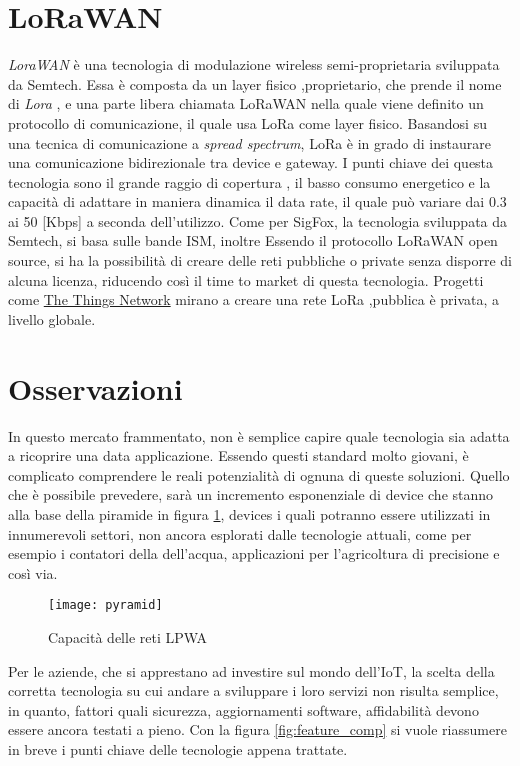 \section{LoRaWAN}
\emph{LoraWAN} è una tecnologia di modulazione wireless semi-proprietaria 
sviluppata da Semtech. Essa è composta da un layer fisico ,proprietario, che
prende il nome di \emph{Lora}\cite{LoRaCss101} , e una parte libera chiamata 
LoRaWAN\cite{LoRaWAN101} nella quale viene definito un protocollo di comunicazione, 
il quale usa LoRa come layer fisico. 
Basandosi su una tecnica di comunicazione a \emph{spread spectrum}, LoRa è in
grado di instaurare una comunicazione bidirezionale tra device e gateway.
I punti chiave dei questa tecnologia sono il grande raggio di copertura , il 
basso consumo energetico e la capacità di adattare in maniera dinamica il
data rate, il quale può variare dai 0.3 ai 50 [Kbps] a seconda dell'utilizzo. 
Come per SigFox, la tecnologia sviluppata da Semtech, si basa sulle bande ISM,
inoltre Essendo il protocollo LoRaWAN open source, si ha la possibilità di
creare delle reti pubbliche o private senza disporre di alcuna licenza, 
riducendo così il time to market di questa tecnologia.  
Progetti come \href{https://www.thethingsnetwork.org/}{The Things Network}
mirano a creare una rete LoRa ,pubblica è privata,  a livello globale.

\section{Osservazioni}
In questo mercato frammentato, non è semplice capire quale tecnologia sia adatta
a ricoprire una data applicazione. Essendo questi standard molto giovani, è
complicato comprendere le reali potenzialità di ognuna di queste soluzioni.
Quello che è possibile prevedere, sarà un incremento esponenziale di device che
stanno alla base della piramide in figura \ref{fig:pyramid}, devices i quali
potranno essere utilizzati in innumerevoli settori, non ancora esplorati dalle
tecnologie attuali, come per esempio i contatori della dell'acqua, applicazioni
per l'agricoltura di precisione e così via. 

\begin{figure}[ht]
    \centering 
                \texttt{[image: pyramid]}
    \caption{Capacità delle reti LPWA}
    \label{fig:pyramid} 
\end{figure}

\pagebreak
Per le aziende, che si apprestano ad investire sul mondo dell'IoT, la scelta
della corretta tecnologia su cui andare a sviluppare i loro servizi non risulta
semplice, in quanto, fattori quali sicurezza, aggiornamenti software,
affidabilità devono essere ancora testati a pieno. Con la figura
\ref{fig:feature_comp} si vuole riassumere in breve i punti chiave delle
tecnologie appena trattate.

